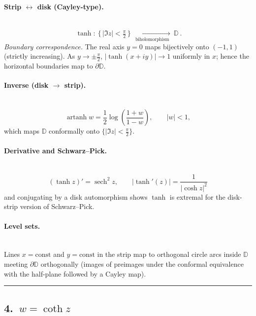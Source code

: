\documentclass[11pt]{article}
\begin{document}
\medskip

\paragraph{Strip $\leftrightarrow$ disk (Cayley-type).}\mbox{}\\[2pt]
\[
\boxed{\
	\tanh:\ \{\,|\Im z|<\tfrac{\pi}{2}\,\}\ \xrightarrow[\ \text{biholomorphism}\ ]{}\ \mathbb D\ .
}
\]
\emph{Boundary correspondence.} The real axis $y=0$ maps bijectively onto $(-1,1)$ (strictly increasing).
As $y\to\pm\frac{\pi}{2}$, $|\tanh(x+iy)|\to1$ uniformly in $x$; hence the horizontal boundaries map to $\partial\mathbb D$.

\medskip

\paragraph{Inverse (disk $\to$ strip).}\mbox{}\\[2pt]
\[
\operatorname{artanh} w=\frac{1}{2}\log\!\left(\frac{1+w}{1-w}\right),
\qquad |w|<1,
\]
which maps $\mathbb D$ conformally onto $\{|\Im z|<\tfrac{\pi}{2}\}$.

\medskip

\paragraph{Derivative and Schwarz--Pick.}\mbox{}\\[2pt]
\[
(\tanh z)'=\operatorname{sech}^{2}\!z,\qquad
\left|\tanh'(z)\right|=\frac{1}{|\cosh z|^{2}}
\]
and conjugating by a disk automorphism shows $\tanh$ is extremal for the disk-strip version of Schwarz--Pick.

\medskip

\paragraph{Level sets.}\mbox{}\\[2pt]
Lines $x=\text{const}$ and $y=\text{const}$ in the strip map to orthogonal circle arcs inside $\mathbb D$ meeting $\partial\mathbb D$ orthogonally (images of preimages under the conformal equivalence with the half-plane followed by a Cayley map).

\bigskip\hrule\bigskip

\subsection*{4.\ $w=\coth z$}
\end{document}

